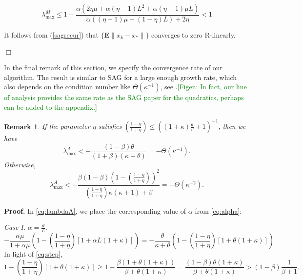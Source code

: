 \documentclass[11pt]{article}
\newtheorem{rem}[thm]{Remark}
\newcommand{\E}{\mathbf{E}}
\begin{document}
     \begin{equation}\label{sagspec}
  \lambda^M_{\max} \leq 1-\frac{\alpha  \left(2 \eta  \mu +\alpha  (\eta -1) L^2+\alpha  (\eta -1) \mu  L\right)}{\alpha  ((\eta +1) \mu -  (1-\eta ) L)+2 \eta }<1
   \end{equation}
	
  It follows from (\ref{sagrecur}) that $\{\E\|x_k-x_\ast\|\}$  converges to zero R-linearly.
  
  \hspace*{\fill}$\Box$\medskip

In the final remark of this section, we specify the convergence rate of our algorithm. The result is similar to SAG for a large enough growth rate, which also depends on the condition number like $\Theta(\kappa^{-1})$, see \cite{roux2012stochastic}.\textcolor{green}{[Figen: In fact, our line of analysis provides the same rate as the SAG paper for the quadratics, perhaps can be added to the appendix.]}

\begin{rem}\label{lemma:order}
If the parameter $\eta$ satisfies ${\left(\frac{1-\eta}{1+\eta}\right)} \leq \left((1+\kappa)\frac{\theta}{\beta} + 1\right)^{-1}$, then we have 
\begin{equation}\label{eq:rate1}
\lambda_{\max}^A < -\frac{(1-\beta)\theta}{(1+\beta)(\kappa+\theta)} = -\Theta(\kappa^{-1}).   
\end{equation}
Otherwise, 
\begin{equation}\label{eq:rate2}
 \lambda_{\max}^A < -\frac{\beta(1-\beta)(1-{\left(\frac{1-\eta}{1+\eta}\right)})^2}{{\left(\frac{1-\eta}{1+\eta}\right)}\kappa(\kappa+1)+\beta} = -\Theta(\kappa^{-2}).
\end{equation}
\end{rem}

\noindent 
\textbf{Proof.} In \eqref{eq:lambdaA}, we place the corresponding value of $\alpha$ from \eqref{eq:alpha}:



\textit{Case I.} $\alpha=\displaystyle\frac{\theta}{L}$. 
\[
 -\frac{\alpha\mu}{1+\alpha\mu}\left(1-{\left(\frac{1-\eta}{1+\eta}\right)}[1+\alpha L(1+\kappa)]\right) = -\frac{\theta}{\kappa+\theta}\left(1-{\left(\frac{1-\eta}{1+\eta}\right)}[1+\theta(1+\kappa)]\right)
\]
In light of \eqref{eq:step}, 
\[
 1-{\left(\frac{1-\eta}{1+\eta}\right)}[1+\theta(1+\kappa)]\geq 1-\frac{\beta(1+\theta(1+\kappa))}{\beta+\theta(1+\kappa)} = \frac{(1-\beta)\theta(1+\kappa)}{\beta+\theta(1+\kappa)}> (1-\beta)\frac{1}{\beta+1}.
\]
\end{document}
